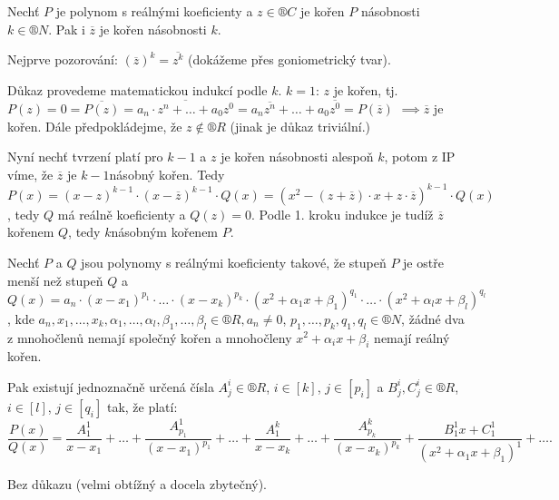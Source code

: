 \documentclass[12pt]{article}                   %
\begin{document}
        \begin{lemma}
            Nechť $P$ je polynom s reálnými koeficienty a $z \in ®C$ je kořen $P$ násobnosti $k \in ®N$. Pak i $\overline{z}$ je kořen násobnosti $k$.

            \begin{dukazin}
                Nejprve pozorování: $(\overline{z})^k = \overline{z^k}$ (dokážeme přes goniometrický tvar).

                Důkaz provedeme matematickou indukcí podle $k$. $k = 1$: $z$ je kořen, tj. $P(z) = 0 = \overline{P(z)} = \overline{a_n·z^n + … + a_0z^0} = a_n\overline{z^n} + … + a_0\overline{z^0} = P(\overline{z})$ $\implies \overline{z}$ je kořen. Dále předpokládejme, že $z \notin ®R$ (jinak je důkaz triviální.)

                Nyní nechť tvrzení platí pro $k-1$ a $z$ je kořen násobnosti alespoň $k$, potom z IP víme, že $\overline{z}$ je $k-1$násobný kořen. Tedy $P(x) = (x - z)^{k-1}·(x - \overline{z})^{k-1}·Q(x) = (x^2 - (z + \overline{z})·x + z·\overline{z})^{k-1}·Q(x)$, tedy $Q$ má reálně koeficienty a $Q(z) = 0$. Podle 1. kroku indukce je tudíž $\overline{z}$ kořenem $Q$, tedy $k$násobným kořenem $P$.
            \end{dukazin}
        \end{lemma}

        \begin{veta}
                Nechť $P$ a $Q$ jsou polynomy s reálnými koeficienty takové, že stupeň $P$ je ostře menší než stupeň $Q$ a $Q(x) = a_n·(x - x_1)^{p_1}·…·(x - x_k)^{p_k}·(x^2 + \alpha_1x + \beta_1)^{q_1}·…·(x^2 + \alpha_lx + \beta_l)^{q_l}$, kde $a_n, x_1, …, x_k, \alpha_1, …, \alpha_l, \beta_1, …, \beta_l \in ®R, a_n ≠ 0$, $p_1, …, p_k, q_1, q_l \in ®N$, žádné dva z mnohočlenů nemají společný kořen a mnohočleny $x^2+\alpha_ix+\beta_i$ nemají reálný kořen.

                Pak existují jednoznačně určená čísla $A_j^i \in ®R$, $i \in [k]$, $j \in [p_i]$ a $B^i_j, C^i_j \in ®R$, $i \in [l]$, $j \in [q_i]$ tak, že platí:
                $$ \frac{P(x)}{Q(x)} = \frac{A^1_1}{x - x_1} + … + \frac{A^1_{p_1}}{(x - x_1)^{p_1}} + … + \frac{A^k_1}{x - x_k} + … + \frac{A^k_{p_k}}{(x - x_k)^{p_k}} + \frac{B^1_1x + C^1_1}{(x^2 + \alpha_1 x + \beta_1)^1} + …. $$ 

            \begin{dukazin}
                Bez důkazu (velmi obtížný a docela zbytečný).
            \end{dukazin}
        \end{veta}
\end{document}
